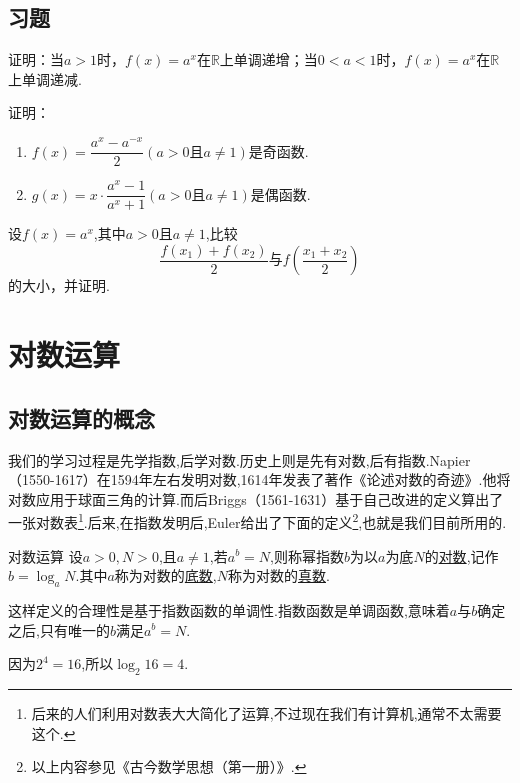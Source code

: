 \documentclass[lang=cn,math=cm,chinesefont=nofont,11pt,scheme=chinese,twocol]{elegantbook}
\begin{document}
\subsection{习题}

\begin{exercise}
  证明：当$a>1$时，$f(x)=a^x$在$\mathbb{R}$上单调递增；当$0<a<1$时，$f(x)=a^x$在$\mathbb{R}$上单调递减.
\end{exercise}

\begin{spacing}{1.8}
\begin{exercise}\label{BJSZ_Algebra1_P116.12}
  证明：
\end{exercise}

\begin{enumerate}
  \item $f(x)=\dfrac{a^x-a^{-x}}{2}(a>0\text{且}a\neq 1)$是奇函数.
  \item $g(x)=x\cdot\dfrac{a^x-1}{a^x+1}(a>0\text{且}a\neq 1)$是偶函数.
\end{enumerate}
\end{spacing}


\begin{exercise}\label{2017RJB_b2_P14.4-1C2}
  设$f(x)=a^x$,其中$a>0$且$a\neq1$,比较$$\frac{f(x_1)+f(x_2)}2\text{与}f(\frac{x_1+x_2}2)$$的大小，并证明.
\end{exercise}

\section{对数运算}

\subsection{对数运算的概念}

我们的学习过程是先学指数,后学对数.历史上则是先有对数,后有指数.Napier（1550-1617）在1594年左右发明对数,1614年发表了著作《论述对数的奇迹》.他将对数应用于球面三角的计算.而后Briggs（1561-1631）基于自己改进的定义算出了一张对数表\footnote{后来的人们利用对数表大大简化了运算,不过现在我们有计算机,通常不太需要这个.}.后来,在指数发明后,Euler给出了下面的定义\footnote{以上内容参见《古今数学思想（第一册）》.},也就是我们目前所用的.

\begin{definition}{对数运算}
  设$a>0,N>0$,且$a\neq 1$,若$a^b=N$,则称幂指数$b$为以$a$为底$N$的\underline{对数},记作$b=\log_aN$.其中$a$称为对数的\underline{底数},$N$称为对数的\underline{真数}.
\end{definition}

\begin{remark}
  这样定义的合理性是基于指数函数的单调性.指数函数是单调函数,意味着$a$与$b$确定之后,只有唯一的$b$满足$a^b=N$.
\end{remark}

\begin{example}
  因为$2^4=16$,所以$\log_2 16=4$.
\end{example}
\end{document}
